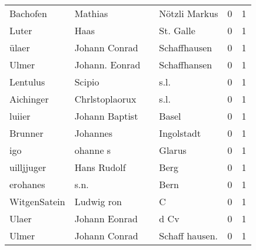 \begin{center}
\begin{tiny}
\begin{longtabu}{llllrr}
                 Bachofen &                            Mathias &             &                               Nötzli Markus &          0 &         1 \\
                    Luter &                               Haas &             &                                   St. Galle &          0 &         1 \\
                    ülaer &                      Johann Conrad &             &                                Schaffhausen &          0 &         1 \\
                    Ulmer &                     Johann. Eonrad &             &                                Schaffhansen &          0 &         1 \\
                 Lentulus &                             Scipio &             &                                        s.l. &          0 &         1 \\
                Aichinger &                     Chrlstoplaorux &             &                                        s.l. &          0 &         1 \\
                   luiier &                     Johann Baptist &             &                                       Basel &          0 &         1 \\
                  Brunner &                           Johannes &             &                                  Ingolstadt &          0 &         1 \\
                      igo &                           ohanne s &             &                                      Glarus &          0 &         1 \\
               uilljjuger &                        Hans Rudolf &             &                                        Berg &          0 &         1 \\
                 erohanes &                               s.n. &             &                                        Bern &          0 &         1 \\
             WitgenSatein &                         Ludwig ron &             &                                           C &          0 &         1 \\
                    Ulaer &                      Johann Eonrad &             &                                        d Cv &          0 &         1 \\
                    Ulmer &                      Johann Conrad &             &                             Schaff hausen.  &          0 &         1 \\

\end{longtabu}
\end{tiny}
\end{center}
